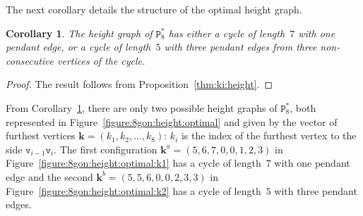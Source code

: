 \documentclass[a4paper,12pt]{article}
\theoremstyle{definition}
\theoremstyle{plain}
\newtheorem{corollary}{Corollary}
\newcommand{\rv}[1]{\boldsymbol{#1}}
\newcommand{\geo}[1]{\mathtt{#1}}
\begin{document}
The next corollary details the structure of the optimal height graph.
\begin{corollary}\label{thm:height:optimal}
	The height graph of $\geo{P}_8^*$ has either a cycle of length~$7$ with one pendant edge, or a cycle of length~$5$ with three pendant edges from three non-consecutive vertices of the cycle.
\end{corollary}
\begin{proof}
	The result follows from Proposition~\ref{thm:ki:height}.
\end{proof}

From Corollary~\ref{thm:height:optimal}, there are only two possible height graphs of $\geo{P}_8^*$, both represented in Figure~\ref{figure:8gon:height:optimal} and given by the vector of furthest vertices $\rv{k} = (k_1, k_2,\ldots,k_8)$: $k_i$ is the index of the furthest vertex to the side $\geo{v}_{i-1}\geo{v}_i$. The first configuration $\rv{k}^a =(5,6,7,0,0,1,2,3)$ in Figure~\ref{figure:8gon:height:optimal:k1} has a cycle of length~$7$ with one pendant edge and the second $\rv{k}^b =(5,5,6,0,0,2,3,3)$ in Figure~\ref{figure:8gon:height:optimal:k2} has a cycle of length~$5$ with three pendant edges.
\end{document}
